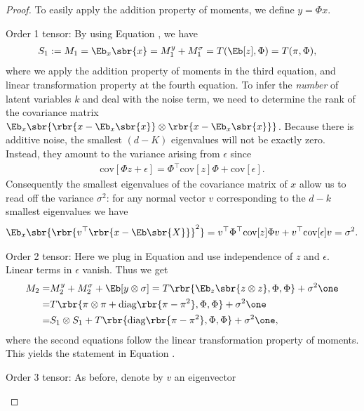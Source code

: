 \documentclass[twoside,11pt]{article}
\begin{document}
{\begin{proof}
To easily apply the addition property of moments, we define $y = \Phi x.$ 
\begin{description*}
\item[Order 1 tensor:] By using Equation , we have
 \begin{align}
  S_1 := M_1 &= \Eb_x \sbr{x} = M_1^y + M_1^\sigma =  T(\Eb[z], \Phi)= T( \pi, \Phi),
 \end{align}
 where we apply the addition property of moments in the third equation, and linear transformation property at the fourth equation.
 To infer the \emph{number} of latent variables $k$ and deal with the
 noise term, we need to determine the rank of the covariance matrix $\Eb_x
 \sbr{\rbr{x- \Eb_x{\sbr{x}}}\otimes \rbr{x-
     \Eb_x{\sbr{x}}}}$. Because there is additive noise, the smallest
 $(d-K)$ eigenvalues will not be exactly zero. Instead, they amount to
 the variance arising from $\epsilon$ since
 \begin{align}
   \mathrm{cov}[\Phi z + \epsilon] = \Phi^\top \mathrm{cov}[z] \Phi + \mathrm{cov}[\epsilon].
 \end{align}
 Consequently the smallest eigenvalues of the covariance matrix of $x$
 allow us to read off the variance $\sigma^2$: for any normal vector
 $v$ corresponding to the $d-k$ smallest eigenvalues we have
 \begin{align}
   \label{eq:gaussian-variance-1}
   \Eb_x \sbr{ \rbr{ v^\top \rbr{x-\Eb \sbr{X}}}^2}= 
   v^\top \Phi^\top \mathrm{cov}[z] \Phi v + v^\top \mathrm{cov}[\epsilon] v
   = \sigma^2.
 \end{align}
\item[Order 2 tensor:]
 Here we plug in Equation  and use
 independence of $z$ and $\epsilon$. Linear terms in $\epsilon$
 vanish. Thus we get
\begin{align}
  \nonumber
  M_2 =& M_2^y + M_2^\sigma + \Eb[y \otimes \sigma]  
         = T\rbr{ \Eb_z \sbr{z\otimes z},\Phi,\Phi}   + \sigma^2 \one \\
  =& T\rbr{ \pi \otimes \pi + \mathrm{diag}\rbr{\pi -\pi^2}, \Phi,\Phi}
        + \sigma^2 \one \\
  =& S_1 \otimes S_1 +  T\rbr{ \mathrm{diag}\rbr{\pi -
       \pi^2}, \Phi, \Phi} + \sigma^2 \one,
\end{align}
where the second equations follow the linear transformation property of moments.
This yields the statement in Equation .
\item[Order 3 tensor:] As before, denote by $v$ an eigenvector

\end{description*}
\end{proof}}
\end{document}
